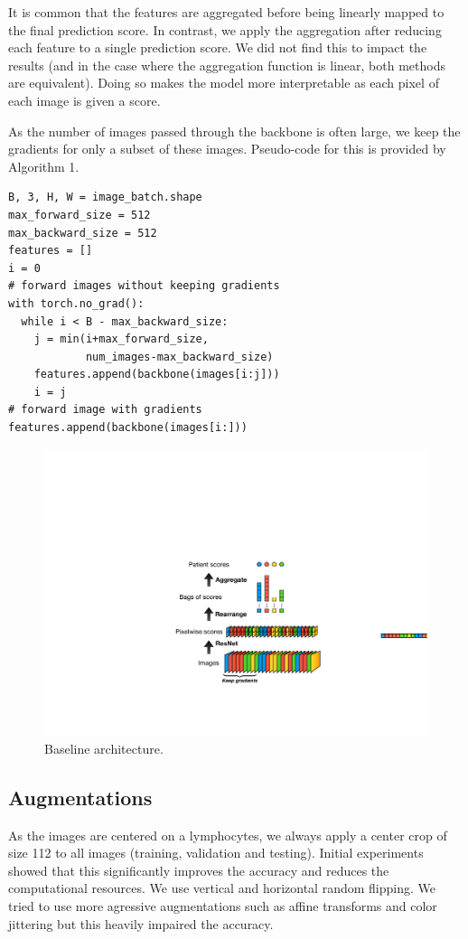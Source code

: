 \documentclass[final]{cvpr}
\begin{document}
	It is common that the features are aggregated before being linearly mapped to the final prediction score.
	In contrast, we apply the aggregation after reducing each feature to a single prediction score. We did not find this to impact the results (and in the case where the aggregation function is linear, both methods are equivalent). Doing so makes the model more interpretable as each pixel of each image is given a score. 
	

	As the number of images passed through the backbone is often large, we keep the gradients for only a subset of these images. Pseudo-code for this is provided by Algorithm 1.
	
	\begin{Verbatim}[fontsize=\footnotesize, samepage=true]
B, 3, H, W = image_batch.shape
max_forward_size = 512
max_backward_size = 512
features = []
i = 0
# forward images without keeping gradients
with torch.no_grad():
  while i < B - max_backward_size:
    j = min(i+max_forward_size,
            num_images-max_backward_size)
    features.append(backbone(images[i:j]))
    i = j
# forward image with gradients
features.append(backbone(images[i:]))
	\end{Verbatim}

\begin{figure}[t]
	\begin{center}
		\includegraphics[width=0.9\linewidth]{graphic2.pdf}
	\end{center}
	\caption{Baseline architecture.}
	\label{fig:overview}
\end{figure}

\subsection{Augmentations}
As the images are centered on a lymphocytes, we always apply a center crop of size 112 to all images (training, validation and testing). Initial experiments showed that this significantly improves the accuracy and reduces the computational resources. We use vertical and horizontal random flipping. We tried to use more agressive augmentations such as affine transforms and color jittering but this heavily impaired the accuracy.
\end{document}

